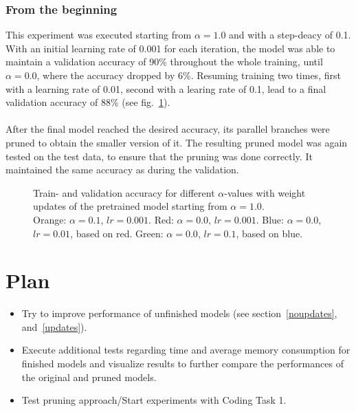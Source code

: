 \documentclass[10pt,twocolumn,letterpaper]{article}
\begin{document}
\subsubsection{From the beginning}
This experiment was executed starting from $\alpha=1.0$ and with a step-deacy of 0.1.
With an initial learning rate of 0.001 for each iteration, the model was able to maintain a validation accuracy of 90\% throughout the whole training, until $\alpha=0.0$, where the accuracy dropped by 6\%.
Resuming training two times, first with a learning rate of 0.01, second with a learing rate of 0.1, lead to a final validation accuracy of 88\% (see fig.~\ref{fig:updates-beginning}).\\\\
After the final model reached the desired accuracy, its parallel branches were pruned to obtain the smaller version of it.
The resulting pruned model was again tested on the test data, to ensure that the pruning was done correctly.
It maintained the same accuracy as during the validation.
\begin{figure}[hpbt]
	\centering
	\centering
	\hspace{0.1\textwidth}
	\caption[]{Train- and validation accuracy for different $\alpha$-values with weight updates of the pretrained model starting from $\alpha=1.0$.\\
		Orange: $\alpha=0.1$, $lr=0.001$.
		Red: $\alpha=0.0$, $lr=0.001$.
		Blue: $\alpha=0.0$, $lr=0.01$, based on red.
		Green: $\alpha=0.0$, $lr=0.1$, based on blue.}
	\label{fig:updates-beginning}
\end{figure}

\section{Plan}
\begin{itemize}
	\item Try to improve performance of unfinished models (see section~\ref{noupdates}, and~\ref{updates}).
	\item Execute additional tests regarding time and average memory consumption for finished models and visualize results to further compare the performances of the original and pruned models.
	\item Test pruning approach/Start experiments with Coding Task 1.
\end{itemize}

{\small


}
\end{document}
